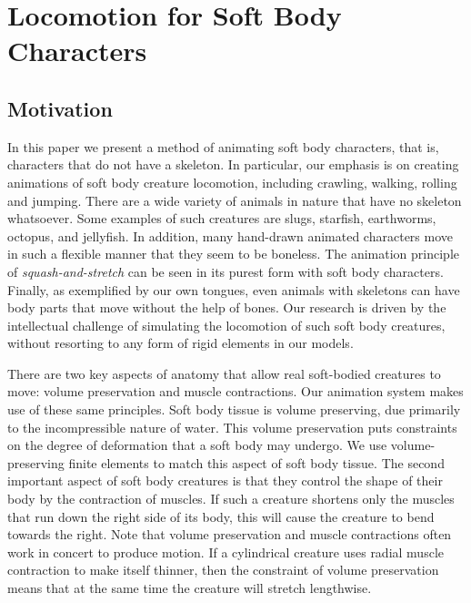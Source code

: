 \chapter{Locomotion for Soft Body Characters}

\section{Motivation}

In this paper we present a method of animating soft body characters, that
is, characters that do not have a skeleton.  In particular, our emphasis
is on creating animations of soft body creature locomotion, including
crawling, walking, rolling and jumping.  There are a wide variety of
animals in nature that have no skeleton whatsoever.  Some examples of
such creatures are slugs, starfish, earthworms, octopus, and jellyfish.
In addition, many hand-drawn animated characters move in such a flexible
manner that they seem to be boneless.  The animation principle of
\emph{squash-and-stretch} can be seen in its purest form with soft body
characters.  Finally, as exemplified by our own tongues, even animals with
skeletons can have body parts that move without the help of
bones.  Our research is driven by the intellectual challenge of
simulating the locomotion of such soft body creatures, without resorting
to any form of rigid elements in our models.

There are two key aspects of anatomy that allow real soft-bodied creatures
to move: volume preservation and muscle contractions.  Our animation
system makes use of these same principles.  Soft body tissue is volume
preserving, due primarily to the incompressible nature of water.  This
volume preservation puts constraints on the degree of deformation that a
soft body may undergo.  We use volume-preserving finite elements to match
this aspect of soft body tissue.  The second important aspect of soft body
creatures is that they control the shape of their body by the contraction of
muscles.  If such a creature shortens only the muscles that run down the
right side of its body, this will cause the creature to bend towards the
right.  Note that volume preservation and muscle contractions often work
in concert to produce motion.  If a cylindrical creature uses radial
muscle contraction to make itself thinner, then the constraint of volume
preservation means that at the same time the creature will stretch
lengthwise.


